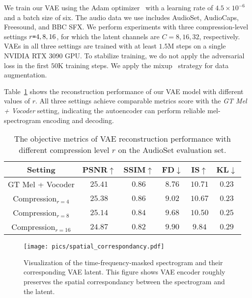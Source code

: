 \documentclass{article}
\begin{document}
We train our VAE using the Adam optimizer~\cite{kingma2014adam} with a learning rate of $4.5\times 10^{-6}$ and a batch size of six. The audio data we use includes AudioSet, AudioCaps, Freesound, and BBC SFX. We perform experiments with three compression-level settings $r\texttt{=}4,8,16$, for which the latent channels are $C=8,16,32$, respectively.  VAEs in all three settings are trained with at least $1.5$M steps on a single NVIDIA RTX 3090 GPU. To stabilize training, we do not apply the adversarial loss in the first $50$K training steps. We apply the mixup~\cite{kong2020panns} strategy for data augmentation. 












Table~\ref{tab: vae-reconstruct} shows the reconstruction performance of our VAE model with different values of $r$. All three settings achieve comparable metrics score with the \textit{GT Mel + Vocoder} setting, indicating the autoencoder can perform reliable mel-spectrogram encoding and decoding.



\begin{table}[htbp]
\small
\centering
\begin{tabular}{cccccc}
\toprule
        Setting        & PSNR$\uparrow$  & SSIM$\uparrow$ & FD$\downarrow$   & IS$\uparrow$   & KL$\downarrow$   \\
\midrule
GT Mel + Vocoder & $25.41$ & $0.86$ & $8.76$ & $10.71$ & $0.23$ \\
\midrule
Compression$_{r=4}$     & $25.38$ & $0.86$ & $9.02$ & $10.67$ & $0.23$ \\
Compression$_{r=8}$     & $25.14$ & $0.84$ & $9.68$ & $10.50$ & $0.25$ \\
Compression$_{r=16}$    & $24.87$ & $0.82$ & $9.90$ & $9.84$ & $0.29$ \\
\bottomrule
\end{tabular}
\caption{The objective metrics of VAE reconstruction performance with different compression level $r$ on the AudioSet evaluation set.}
\label{tab: vae-reconstruct}
\end{table}

\begin{figure}[htbp]
    \centering
    \texttt{[image: pics/spatial\_correspondancy.pdf]}
    \caption{Visualization of the time-frequency-masked spectrogram and their corresponding VAE latent. This figure shows VAE encoder roughly preserves the spatial correspondancy between the spectrogram and the latent.}
    \label{fig:demo-spatial-correspondancy}
\end{figure}
\end{document}
